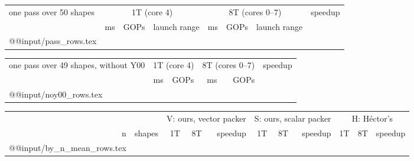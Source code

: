 \begin{center}\small
\begin{tabular}{@{}l rrc rrc r@{}}
\toprule
one pass over 50 shapes & \multicolumn{3}{c}{1T (core 4)} & \multicolumn{3}{c}{8T (cores 0--7)} & speedup \\
\cmidrule(lr){2-4}\cmidrule(lr){5-7}
 & ms & GOPs & launch range & ms & GOPs & launch range & \\
\midrule
\csname @@input\endcsname \E/pass_rows.tex
\bottomrule
\end{tabular}
\end{center}

\begin{center}\small
\begin{tabular}{@{}l rr rr r@{}}
\toprule
one pass over 49 shapes, without Y00 & \multicolumn{2}{c}{1T (core 4)} & \multicolumn{2}{c}{8T (cores 0--7)} & speedup \\
 & ms & GOPs & ms & GOPs & \\
\midrule
\csname @@input\endcsname \E/noy00_rows.tex
\bottomrule
\end{tabular}
\end{center}



\begin{center}\small\setlength\tabcolsep{4pt}
\begin{tabular}{@{}rr rrr rrr rrr@{}}
\toprule
 & & \multicolumn{3}{c}{V: ours, vector packer} & \multicolumn{3}{c}{S: ours, scalar packer} & \multicolumn{3}{c}{H: H\'ector's} \\
\cmidrule(lr){3-5}\cmidrule(lr){6-8}\cmidrule(l){9-11}
n & shapes & 1T & 8T & speedup & 1T & 8T & speedup & 1T & 8T & speedup \\
\midrule
\csname @@input\endcsname \E/by_n_mean_rows.tex
\bottomrule
\end{tabular}
\end{center}

